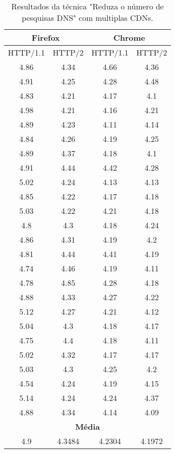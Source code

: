 \begin{table}[H]
	\centering
	\caption{Resultados da técnica "Reduza o número de pesquisas DNS" com multiplas CDNs.}
	\label{resultados-reduzaonumerodepesquisasdns-multiplas}
	\begin{tabular}{cccc}
		\hline
		\multicolumn{2}{c}{\textbf{Firefox}} & \multicolumn{2}{c}{\textbf{Chrome}} \\
		\hline
		HTTP/1.1 & HTTP/2 & HTTP/1.1 & HTTP/2 \\
		\hline
		4.86 & 4.34 & 4.66 & 4.36 \\
		4.91 & 4.25 & 4.28 & 4.48 \\
		4.83 & 4.21 & 4.17 & 4.1 \\
		4.98 & 4.21 & 4.16 & 4.21 \\
		4.89 & 4.23 & 4.11 & 4.14 \\
		4.84 & 4.26 & 4.19 & 4.25 \\
		4.89 & 4.37 & 4.18 & 4.1 \\
		4.91 & 4.44 & 4.42 & 4.28 \\
		5.02 & 4.24 & 4.13 & 4.13 \\
		4.85 & 4.22 & 4.17 & 4.18 \\
		5.03 & 4.22 & 4.21 & 4.18 \\
		4.8 & 4.3 & 4.18 & 4.24 \\
		4.86 & 4.31 & 4.19 & 4.2 \\
		4.81 & 4.44 & 4.41 & 4.19 \\ 
		4.74 & 4.46 & 4.19 & 4.11 \\
		4.78 & 4.85 & 4.28 & 4.18 \\
		4.88 & 4.33 & 4.27 & 4.22 \\ 
		5.12 & 4.27 & 4.21 & 4.12 \\
		5.04 & 4.3 & 4.18 & 4.17 \\
		4.75 & 4.4 & 4.18 & 4.11 \\
		5.02 & 4.32 & 4.17 & 4.17 \\
		5.03 & 4.3 & 4.25 & 4.2 \\
		4.54 & 4.24 & 4.19 & 4.15 \\
		5.14 & 4.24 & 4.24 & 4.37 \\
		4.88 & 4.34 & 4.14 & 4.09 \\
		\hline
		\multicolumn{4}{c}{\textbf{Média}} \\
		4.9 & 4.3484 & 4.2304 & 4.1972 \\
		\hline
	\end{tabular}
\end{table}